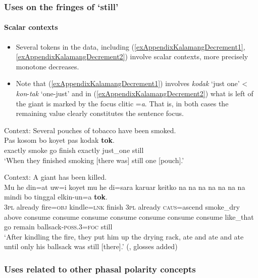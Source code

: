 \subsubsection{Uses on the fringes of \lq{}still\rq{}}
\paragraph{Scalar contexts}\label{appendixKalamangScalar}
\begin{itemize}
	\item Several tokens in the data, including (\ref{exAppendixKalamangDecrement1}, \ref{exAppendixKalamangDecrement2}) involve scalar contexts, more precisely monotone decreases.
	\item Note	that (\ref{exAppendixKalamangDecrement1}) involves \textit{kodak} \lq just one\rq{} < \textit{kon}-\textit{tak} \lq one-just\rq{ }and in (\ref{exAppendixKalamangDecrement2}) what is left of the giant is marked by the focus clitic \mbox{=\textit{a}}. That is, in both cases the remaining value clearly constitutes the sentence focus.
\end{itemize}

\begin{exe}
	\ex\label{exAppendixKalamangDecrement1}
	Context: Several pouches of tobacco have been smoked.\\
	\gll Pas kosom bo koyet pas kodak \textbf{tok}.\\
	exactly smoke go finish exactly just\_one still\\
	\glt \lq When they finished smoking [there was] still one [pouch].\rq{ }\parencite[9]{Visser2021a}

	\ex\label{exAppendixKalamangDecrement2}
	Context: A giant has been killed.\\
	\gll Mu he din=at uw=i koyet mu he di=sara karuar keitko na na na na na na na mindi bo tinggal elkin-un=a \textbf{tok}.\\
	3\textsc{pl} already fire=\textsc{obj} kindle=\textsc{lnk} finish 3\textsc{pl} already \textsc{caus}=ascend smoke\_dry above consume consume consume consume consume consume consume like\_that go remain ballsack-\textsc{poss}.3=\textsc{foc} still\\
	\glt \lq After kindling the fire, they put him up the drying rack, ate and ate and ate until only his ballsack was still [there].\rq{ }(\cite{Visser2021b}, glosses added)
\end{exe}



\subsubsection{Uses related to other phasal polarity concepts}
